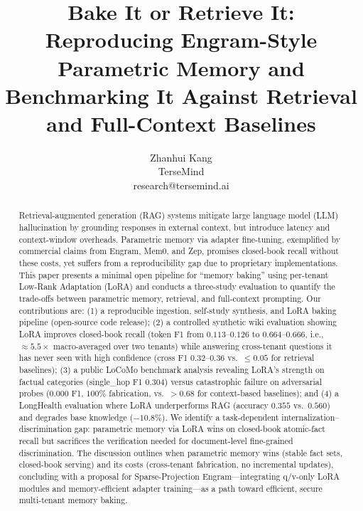 \documentclass[conference]{IEEEtran}
\title{Bake It or Retrieve It: Reproducing Engram-Style Parametric Memory and Benchmarking It Against Retrieval and Full-Context Baselines}
\author{Zhanhui Kang\\TerseMind\\research@tersemind.ai}
\begin{document}
\maketitle

\begin{abstract}
Retrieval-augmented generation (RAG) systems mitigate large language model (LLM) hallucination by grounding responses in external context, but introduce latency and context-window overheads. Parametric memory via adapter fine-tuning, exemplified by commercial claims from Engram, Mem0, and Zep, promises closed-book recall without these costs, yet suffers from a reproducibility gap due to proprietary implementations. This paper presents a minimal open pipeline for ``memory baking'' using per-tenant Low-Rank Adaptation (LoRA) and conducts a three-study evaluation to quantify the trade-offs between parametric memory, retrieval, and full-context prompting. Our contributions are: (1) a reproducible ingestion, self-study synthesis, and LoRA baking pipeline (open-source code release); (2) a controlled synthetic wiki evaluation showing LoRA improves closed-book recall (token F1 from $0.113$--$0.126$ to $0.664$--$0.666$, i.e., $\approx 5.5\times$ macro-averaged over two tenants) while answering cross-tenant questions it has never seen with high confidence (cross F1 $0.32$--$0.36$ vs.\ $\le 0.05$ for retrieval baselines); (3) a public LoCoMo benchmark analysis revealing LoRA's strength on factual categories (single\_hop F1 $0.304$) versus catastrophic failure on adversarial probes ($0.000$ F1, $100\%$ fabrication, vs.\ $>0.68$ for context-based baselines); and (4) a LongHealth evaluation where LoRA underperforms RAG (accuracy $0.355$ vs.\ $0.560$) and degrades base knowledge ($-10.8\%$). We identify a task-dependent internalization--discrimination gap: parametric memory via LoRA wins on closed-book atomic-fact recall but sacrifices the verification needed for document-level fine-grained discrimination. The discussion outlines when parametric memory wins (stable fact sets, closed-book serving) and its costs (cross-tenant fabrication, no incremental updates), concluding with a proposal for Sparse-Projection Engram---integrating q/v-only LoRA modules and memory-efficient adapter training---as a path toward efficient, secure multi-tenant memory baking.
\end{abstract}
\end{document}
